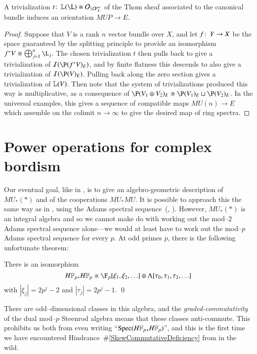 \begin{theorem}\label{ComplexOrientationsInTermsOfTrivs}
A trivialization $t\co \ThomSheaf{\L} \cong \sheaf O_{\CP^\infty_E}$ of the Thom sheaf associated to the canonical bundle induces an orientation $MUP \to E$.
\end{theorem}
\begin{proof}
Suppose that $V$ is a rank $n$ vector bundle over $X$, and let $f\colon\thinspace Y \to X$ be the space guaranteed by the splitting principle to provide an isomorphism $f^* V \cong \bigoplus_{j=1}^n \L_j$.  The chosen trivialization $t$ then pulls back to give a trivialization of $\sheaf I(\P(f^* V)_E)$, and by finite flatness this descends to also give a trivialization of $\sheaf I(\P(V)_E)$.  Pulling back along the zero section gives a trivialization of $\mathbb{L}(V)$.  Then note that the system of trivializations produced this way is multiplicative, as a consequence of $\P(V_1 \oplus V_2)_E \cong \P(V_1)_E \sqcup \P(V_2)_E$.  In the universal examples, this gives a sequence of compatible maps $MU(n) \to E$ which assemble on the colimit $n \to \infty$ to give the desired map of ring spectra.
\end{proof}










\section{Power operations for complex bordism}\label{QuillenPowerOpnsSection}

Our eventual goal, like in , is to give an algebro-geometric description of $MU_*(*)$ and of the cooperations $MU_* MU$.  It is possible to approach this the same way as in , using the Adams spectral sequence~(\cite[Theorem 2]{QuillenAdamsSS}, \cite[Lecture 9]{LurieChromaticCourseNotes}).  However, $MU_*(*)$ is an integral algebra and so we cannot make do with working out the mod--$2$ Adams spectral sequence alone---we would at least have to work out the mod--$p$ Adams spectral sequence for every $p$.  At odd primes $p$, there is the following unfortunate theorem:
\begin{theorem}
There is an isomorphism
\[\HFp_* \HFp \cong \F_p[\xi_1, \xi_2, \ldots] \otimes \Lambda[\tau_0, \tau_1, \tau_2, \ldots]\]
with $|\xi_j| = 2p^j-2$ and $|\tau_j| = 2p^j - 1$. \qed
\end{theorem}
\noindent There are odd--dimensional classes in this algebra, and the \emph{graded-commutativity} of the dual mod--$p$ Steenrod algebra means that these classes anti-commute.  This prohibits us both from even writing ``$\Spec(\HFp_* \HFp)$'', and this is the first time we have encountered Hindrance~\#\ref{SkewCommutativeDeficiency} from  in the wild.

